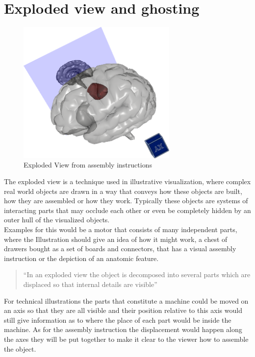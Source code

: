 \section{Exploded view and ghosting}
\begin{figure}[tb]
	\centering
	\includegraphics[width=0.7\textwidth]{chapters/figures/demo}
	\caption{Exploded View from assembly instructions \cite{misc:ikea}}
	\label{fig:ikea}
\end{figure}
The exploded view is a technique used in illustrative visualization, where complex real world objects are drawn in a way that conveys how these objects are built, how they are assembled or how they work. Typically these objects are systems of interacting parts that may occlude each other or even be completely hidden by an outer hull of the visualized objects.\\
Examples for this would be a motor that consists of many independent parts, where the Illustration should give an idea of how it might work, a chest of drawers bought as a set of boards and connectors, that has a visual assembly instruction or the depiction of an anatomic feature.\\
\begin{quote}
``In an exploded view the object is decomposed into several parts which are displaced so that internal details are visible'' \cite{proc:bruckner-2006-EVV}
\end{quote}
For technical illustrations the parts that constitute a machine could be moved on an axis so that they are all visible and their position relative to this axis would still give information as to where the place of each part would be inside the machine. As for the assembly instruction the displacement would happen along the axes they will be put together to make it clear to the viewer how to assemble the object.\\
